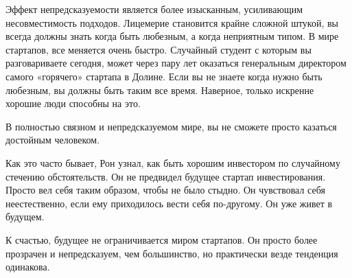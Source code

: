 \documentclass[ebook,12pt,oneside,openany]{memoir}
\begin{document}
Эффект непредсказуемости является более изысканным, усиливающим
несовместимость подходов. Лицемерие становится крайне сложной штукой,
вы всегда должны знать когда быть любезным, а когда неприятным типом.
В мире стартапов, все меняется очень быстро. Случайный студент с
которым вы разговариваете сегодня, может через пару лет оказаться
генеральным директором самого «горячего» стартапа в Долине. Если вы не
знаете когда нужно быть любезным, вы должны быть таким все время.
Наверное, только искренне хорошие люди способны на это.

В полностью связном и непредсказуемом мире, вы не сможете просто
казаться достойным человеком.

Как это часто бывает, Рон узнал, как быть хорошим инвестором по
случайному стечению обстоятельств. Он не предвидел будущее стартап
инвестирования. Просто вел себя таким образом, чтобы не было стыдно.
Он чувствовал себя неестественно, если ему приходилось вести себя
по-другому. Он уже живет в будущем.

К счастью, будущее не ограничивается миром стартапов. Он просто более
прозрачен и непредсказуем, чем большинство, но практически везде
тенденция одинакова.
\end{document}
